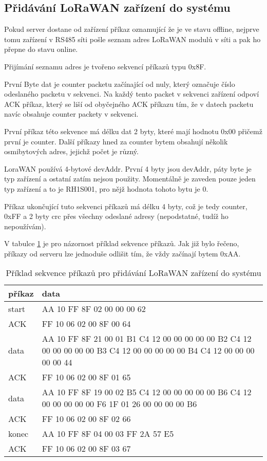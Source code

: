 \subsection{Přidávání LoRaWAN zařízení do systému}
Pokud server dostane od zařízení příkaz oznamující že je ve stavu offline, nejprve tomu zařízení v RS485 síti pošle seznam adres LoRaWAN modulů v síti a pak ho přepne do stavu online.

Přijímání seznamu adres je tvořeno sekvencí příkazů typu 0x8F. 

První Byte dat je counter packetu začínající od nuly, který označuje číslo odeslaného packetu v sekvenci. Na každý tento packet v sekvenci zařízení odpoví ACK příkaz, který se liší od obyčejného ACK příkazu tím, že v datech packetu navíc obsahuje counter packety v sekvenci.

První příkaz této sekvence má délku dat 2 byty, které mají hodnotu 0x00 přičemž první je counter.
Další příkazy hned za counter bytem obsahují několik osmibytových adres, jejichž počet je různý.

LoraWAN používá 4-bytové devAddr. První 4 byty jsou devAddr, páty byte je typ zařízení a ostatní zatím nejsou použity. Momentálně je zaveden pouze jeden typ zařízení a to je RH1S001, pro nějž hodnota tohoto bytu je 0.

Příkaz ukončující tuto sekvenci příkazů má délku 4 byty, což je tedy counter, 0xFF a 2 byty crc přes všechny odeslané adresy (nepodstatné, tudíž ho nepoužívám).

V tabulce \ref{table:2} je pro názornost příklad sekvence příkazů. Jak již bylo řečeno, příkazy od serveru lze jednoduše odlišit tím, že vždy začínají bytem 0xAA.

\begin{table}[!h]
    \begin{tabular}{ |l|p{10cm}| }
    \hline
    příkaz      &  data    \\ \hline \hline
    start      &  AA 10 FF 8F 02 00 00 00 62    \\ \hline
    ACK        &  FF 10 06 02 00 8F 00 64    \\ \hline
    data     &  AA 10 FF 8F 21 00 01 B1 C4 12 00 00 00 00 00 B2 C4 12 00 00 00 00 00 B3 C4 12 00 00 00 00 00 B4 C4 12 00 00 00 00 00 44 \\ \hline
    ACK      &  FF 10 06 02 00 8F 01 65   \\ \hline
    data     &  AA 10 FF 8F 19 00 02 B5 C4 12 00 00 00 00 00 B6 C4 12 00 00 00 00 00 F6 1F 01 26 00 00 00 00 B6 \\ \hline
    ACK      &   FF 10 06 02 00 8F 02 66   \\ \hline
    konec      &   AA 10 FF 8F 04 00 03 FF 2A 57 E5   \\ \hline
    ACK      &   FF 10 06 02 00 8F 03 67  \\ \hline
    \end{tabular}
    \caption{Příklad sekvence příkazů pro přidávání LoRaWAN zařízení do systému}
    \label{table:2}
\end{table}


